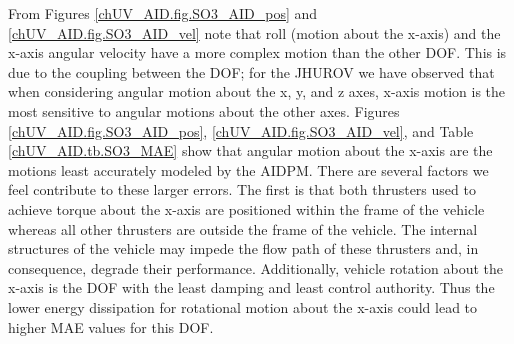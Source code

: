 From Figures \ref{chUV_AID.fig.SO3_AID_pos} and
\ref{chUV_AID.fig.SO3_AID_vel} note that roll (motion about the
x-axis) and the x-axis angular velocity have a more complex motion
than the other \ac{DOF}.  
%
This is due to the coupling between the
\ac{DOF}; for the \ac{JHUROV} we have observed that when considering
angular motion about the x, y, and z axes, x-axis motion is the most
sensitive to angular motions about the other axes.  
%
Figures \ref{chUV_AID.fig.SO3_AID_pos}, \ref{chUV_AID.fig.SO3_AID_vel},
and Table \ref{chUV_AID.tb.SO3_MAE} show that angular motion about the
x-axis are the motions least accurately modeled by the \ac{AIDPM}.
%
There are several factors we feel contribute to these larger errors.
%
The first is that both thrusters used to achieve torque about the
x-axis are positioned within the frame of the vehicle whereas all
other thrusters are outside the frame of the vehicle.
%
The internal structures of the vehicle may impede the flow path of
these thrusters and, in consequence, degrade their performance.
%
Additionally, vehicle rotation about the x-axis is the \ac{DOF} with
the least damping and least control authority.
Thus the lower energy dissipation for rotational motion about the
x-axis could lead to higher \ac{MAE} values for this \ac{DOF}.
